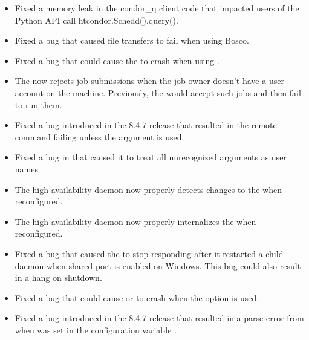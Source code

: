 \begin{itemize}

\item Fixed a memory leak in the condor\_q client code that impacted
users of the Python API call htcondor.Schedd().query().

\item Fixed a bug that caused file transfers to fail when using Bosco.

\item Fixed a bug that could cause the  to crash when using
.

\item The  now rejects job submissions when the job owner
doesn't have a user account on the machine.
Previously, the  would accept such jobs and then fail
to run them.

\item Fixed a bug introduced in the 8.4.7 release that resulted in the remote
 command failing unless the  argument is used.

\item Fixed a bug in  that caused it to treat all unrecognized arguments
as user names

\item The high-availability daemon now properly detects changes to the
 when reconfigured.

\item The high-availability daemon now properly internalizes the
 when reconfigured.

\item Fixed a bug that caused the  to stop responding after it
restarted a child daemon when shared port is enabled on Windows. This bug could also
result in a hang on shutdown.

\item Fixed a bug that could cause  or  to
crash when the  option is used.

\item Fixed a bug introduced in the 8.4.7 release that resulted in a parse error from 
when  was set in the configuration variable .

\end{itemize}

